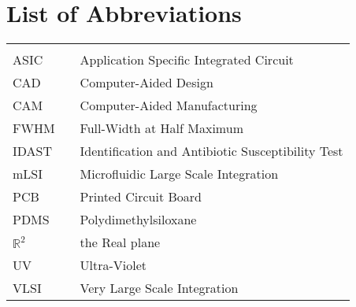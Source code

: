 \chapter*{List of Abbreviations}
\begin{center}
  \begin{tabular}{lll}
    \hspace*{2em} & \hspace*{1in} & \hspace*{4.5in} \\
    ASIC & \dotfill & Application Specific Integrated Circuit \\
    CAD  & \dotfill & Computer-Aided Design \\
    CAM  & \dotfill & Computer-Aided Manufacturing \\
    FWHM & \dotfill & Full-Width at Half Maximum \\
    IDAST &\dotfill & Identification and Antibiotic Susceptibility Test\\
    mLSI & \dotfill & Microfluidic Large Scale Integration \\
    PCB  & \dotfill & Printed Circuit Board \\
    PDMS & \dotfill & Polydimethylsiloxane \\
    $\mathbb{R}^{2}$  & \dotfill & the Real plane \\
    UV	 & \dotfill & Ultra-Violet \\
    VLSI & \dotfill & Very Large Scale Integration \\
  \end{tabular}
\end{center}
\cleardoublepage


\newpage
\endofprelim

